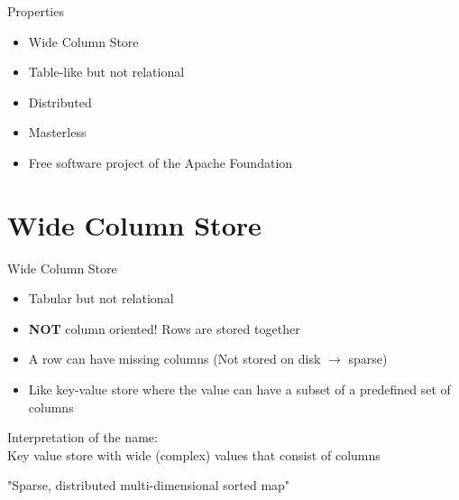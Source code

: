 \documentclass[
  10pt
]{beamer}
\begin{document}
\begin{frame}{Properties}
  \begin{itemize}
    \item<1-> Wide Column Store
    \item<2-> Table-like but not relational
    \item<3-> Distributed
    \item<4-> Masterless
    \item<5-> Free software project of the Apache Foundation
  \end{itemize}
\end{frame}

\section{Wide Column Store}  %
\begin{frame}{Wide Column Store}
  \begin{itemize}
    \item<1-> Tabular but not relational
    \item<2-> \textbf{NOT} column oriented! Rows are stored together
    \item<3-> A row can have missing columns (Not stored on disk $\rightarrow$ sparse)
    \item<4-> Like key-value store where the value can have a subset of a predefined set of columns
  \end{itemize}

  Interpretation of the name: \\
  Key value store with wide (complex) values that consist of columns

  "Sparse, distributed multi-dimensional sorted map"

\end{frame}
\end{document}
